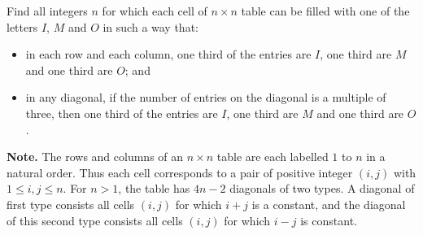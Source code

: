 Find all integers $n$ for which each cell of $n\times n$ table can be filled with one of the letters $I$, $M$ and $O$ in such a way that:
\begin{itemize}
	\item in each row and each column, one third of the entries are $I$, one third are $M$ and one third are $O$; and
	\item in any diagonal, if the number of entries on the diagonal is a multiple of three, then one third of the entries are $I$, one third are $M$ and one third are $O$.
\end{itemize}
\textbf{Note.} The rows and columns of an $n\times n$ table are each labelled $1$ to $n$ in a natural order. Thus each cell corresponds to a pair of positive integer $\left(i,j\right)$ with $1\leq i,j\leq n$. For $n>1$, the table has $4n-2$ diagonals of two types. A diagonal of first type consists all cells $\left(i,j\right)$  for which $i+j$ is a constant, and the diagonal of this second type consists all cells $\left(i,j\right)$ for which $i-j$ is constant.